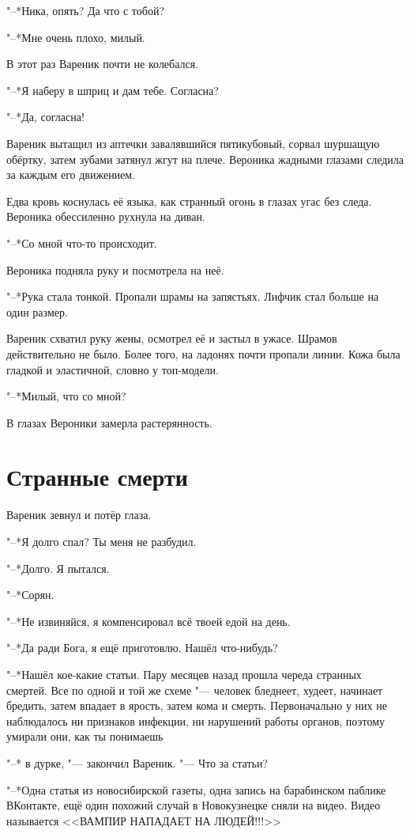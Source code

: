 "--*Ника, опять?
Да что с тобой?

"--*Мне очень плохо, милый.

В этот раз Вареник почти не колебался.

"--*Я наберу в шприц и дам тебе.
Согласна?

"--*Да, согласна!

Вареник вытащил из аптечки завалявшийся пятикубовый, сорвал шуршащую обёртку, затем зубами затянул жгут на плече.
Вероника жадными глазами следила за каждым его движением.

Едва кровь коснулась её языка, как странный огонь в глазах угас без следа.
Вероника обессиленно рухнула на диван.

"--*Со мной что-то происходит.

Вероника подняла руку и посмотрела на неё.

"--*Рука стала тонкой.
Пропали шрамы на запястьях.
Лифчик стал больше на один размер.

Вареник схватил руку жены, осмотрел её и застыл в ужасе.
Шрамов действительно не было.
Более того, на ладонях почти пропали линии.
Кожа была гладкой и эластичной, словно у топ-модели.

"--*Милый, что со мной?

В глазах Вероники замерла растерянность.

\section{Странные смерти}

Вареник зевнул и потёр глаза.

"--*Я долго спал?
Ты меня не разбудил.

"--*Долго.
Я пытался.

"--*Сорян.

"--*Не извиняйся, я компенсировал всё твоей едой на день.

"--*Да ради Бога, я ещё приготовлю.
Нашёл что-нибудь?

"--*Нашёл кое-какие статьи.
Пару месяцев назад прошла череда странных смертей.
Все по одной и той же схеме "--- человек бледнеет, худеет, начинает бредить, затем впадает в ярость, затем кома и смерть.
Первоначально у них не наблюдалось ни признаков инфекции, ни нарушений работы органов, поэтому умирали они, как ты понимаешь\ldotst

"--* \ldotst в дурке, "--- закончил Вареник.
"--- Что за статьи?

"--*Одна статья из новосибирской газеты, одна запись на барабинском паблике ВКонтакте, ещё один похожий случай в Новокузнецке сняли на видео.
Видео называется <<ВАМПИР НАПАДАЕТ НА ЛЮДЕЙ!!!>>


